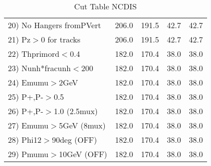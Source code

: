 \begin{table}[h!]
\begin{tabular}{||l||r|r|r|r||}
 20) No Hangers fromPVert &       206.0 &       191.5 &        42.7 &        42.7 \\
 21) Pz$>$0 for tracks    &       206.0 &       191.5 &        42.7 &        42.7 \\
 22) Thprimord$<$0.4      &       182.0 &       170.4 &        38.0 &        38.0 \\
 23) Nunh*fracunh$<$200   &       182.0 &       170.4 &        38.0 &        38.0 \\
 24) Emumu$>$2GeV         &       182.0 &       170.4 &        38.0 &        38.0 \\
 25) P+,P-$>$0.5          &       182.0 &       170.4 &        38.0 &        38.0 \\
 26) P+,P-$>$1.0 (2.5mux) &       182.0 &       170.4 &        38.0 &        38.0 \\
 27) Emumu$>$5GeV  (8mux) &       182.0 &       170.4 &        38.0 &        38.0 \\
 28) Phi12$>$90deg  (OFF) &       182.0 &       170.4 &        38.0 &        38.0 \\
 29) Pmumu$>$10GeV  (OFF) &       182.0 &       170.4 &        38.0 &        38.0 \\
 \hline
 \hline
 \end{tabular}
 \caption{Cut Table  NCDIS  }
 \label{tab-cut_ncdis}
 \end{table}
